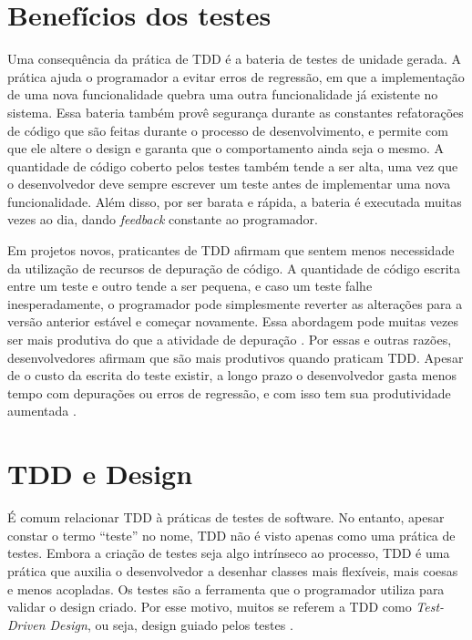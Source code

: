 \section{Benefícios dos testes}

Uma consequência da prática de TDD é a bateria de testes de unidade gerada.
A prática ajuda o programador a evitar erros de regressão, em que a implementação de
uma nova funcionalidade quebra uma outra funcionalidade já existente no sistema.
Essa bateria também provê segurança durante as
constantes refatorações de código que são feitas durante o processo de
desenvolvimento, e permite com que ele altere o design e garanta que o
comportamento ainda seja o mesmo. 
A quantidade de código coberto pelos testes também tende a ser alta, uma vez que o
desenvolvedor deve sempre escrever um teste antes de implementar uma nova
funcionalidade. Além disso, por ser barata e rápida, a bateria é executada
muitas vezes ao dia, dando \textit{feedback} constante ao programador.

Em projetos novos, praticantes de TDD afirmam que sentem menos necessidade da
utilização de recursos de depuração de código. A quantidade de código
escrita entre um teste e outro tende a ser pequena, e caso um teste falhe
inesperadamente, o programador pode simplesmente reverter as alterações para a 
versão anterior estável e começar novamente. Essa abordagem pode muitas vezes
ser mais produtiva do que a atividade de depuração 
\cite{janzen-arch-improvement}. Por essas e outras razões, desenvolvedores afirmam 
que são mais produtivos quando praticam TDD. Apesar de o custo da escrita do teste
existir, a longo prazo o desenvolvedor gasta menos tempo com depurações ou 
erros de regressão, e com isso tem sua produtividade aumentada
\cite{george-e-williams}.

\section{TDD e Design}
\label{cap:tdd-e-design}

É comum relacionar TDD à práticas de testes de software. No entanto, apesar constar o
termo ``teste'' no nome, TDD não é visto apenas como uma prática de testes.
Embora a criação de testes seja algo intrínseco ao processo, TDD é uma prática
que auxilia o desenvolvedor a desenhar classes mais flexíveis, mais coesas e
menos acopladas. Os testes são a ferramenta que o programador utiliza para
validar o design criado. Por esse motivo, muitos se referem a TDD como
\textit{Test-Driven Design}, ou seja, design guiado pelos testes
\cite{tdd-taxonomy}.

